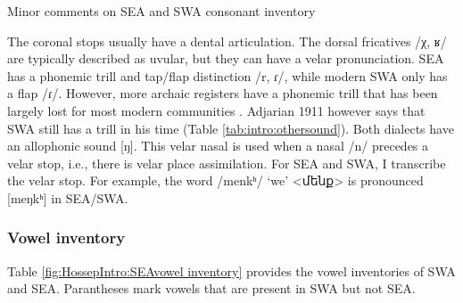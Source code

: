 \begin{exe}
	\ex Minor comments on SEA and SWA consonant inventory\label{list:HossepIntro:seaConsList}
	\begin{xlist}
		\ex The coronal stops usually have a dental articulation. 
		\ex The dorsal fricatives /χ, ʁ/ are typically described as uvular, but they can have a velar pronunciation. 
		\ex SEA has a phonemic trill and tap/flap distinction /r, ɾ/, while modern SWA only has a flap /ɾ/. However, more archaic registers have a phonemic trill that has been largely lost for most modern communities \citep{Tahtadjian-2020-WesterArmenianRhoticDifferentialPhoneticStudy}. Adjarian 1911 however says that SWA still has a trill in his time (Table \ref{tab:intro:othersound}). 
		\ex Both dialects   have an allophonic sound [ŋ]. This velar nasal is used when a nasal /n/ precedes a velar stop, i.e., there is velar place assimilation. For SEA and SWA, I transcribe the velar stop. For example, the word /menkʰ/ `we' <մենք> is pronounced [meŋkʰ] in SEA/SWA.  
		
	\end{xlist}
\end{exe}

\subsubsection{Vowel inventory}\label{sec:HossepIntro:phonotransc:modern:vowe}
Table \ref{fig:HossepIntro:SEAvowel inventory} provides the vowel inventories of SWA and SEA. Parantheses mark vowels that are present in SWA but not SEA. 

